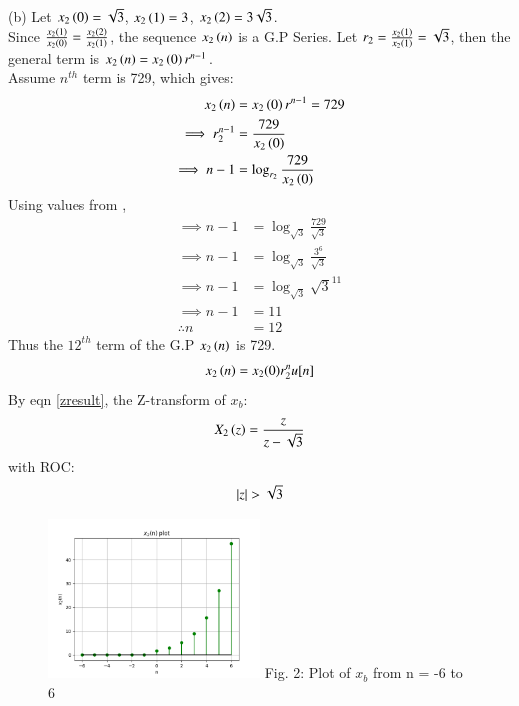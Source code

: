 \documentclass[journal,12pt,twocolumn]{IEEEtran}
\theoremstyle{remark}
\begin{document}
(b) Let $x_2\left(0\right) = \sqrt{3}$, $x_2\left(1\right) = 3$, $x_2\left(2\right) = 3\sqrt{3}$.\\
Since $\frac{x_2\left(1\right)}{x_2\left(0\right)} = \frac{x_2\left(2\right)}{x_2\left(1\right)}$, the sequence $x_2\left(n\right)$ is a G.P Series.
Let $r_2 = \frac{x_2\left(1\right)}{x_2\left(1\right)} = \sqrt{3}$, then the general term is $x_2\left(n\right) = x_2\left(0\right) r^{n-1}$.\\
Assume $n^{th}$ term is 729, which gives: 
\begin{align}
    x_2\left(n\right) &= x_2\left(0\right) r^{n-1} = 729\\
    \implies r_2^{n-1} &= \frac{729}{x_2\left(0\right)}\\
    \implies n - 1 &= \log_{r_2}{\frac{729}{x_2\left(0\right)}}
\end{align}
Using values from ,
\begin{align}
    \implies n - 1 &= \log_{\sqrt{3}}{\frac{729}{\sqrt{3}}}\\
    \implies n - 1 &= \log_{\sqrt{3}}{\frac{3^6}{\sqrt{3}}}\\
    \implies n - 1 &= \log_{\sqrt{3}}{\sqrt{3}^{11}}\\
    \implies n - 1 &= 11\\
    \therefore n &= 12
\end{align}
Thus the $12^{th}$ term of the G.P $x_2\left(n\right)$ is 729.
\begin{align}  x_2\left(n\right) = x_2(0)r_2^nu[n]  \end{align}
By eqn \ref{zresult}, the Z-transform of $x_b$:
\begin{align} X_2\left(z\right) = \frac{z}{z - \sqrt{3}} \end{align}
with ROC: \[ \left\vert z\right\vert > \sqrt{3} \]
\begin{figure}[h!]
    \centering
    \includegraphics[width=0.5\textwidth]{figs/b.png}
    Fig. 2: Plot of $x_b$ from n = -6 to 6
    \label{fig:img2}
\end{figure}
\end{document}
